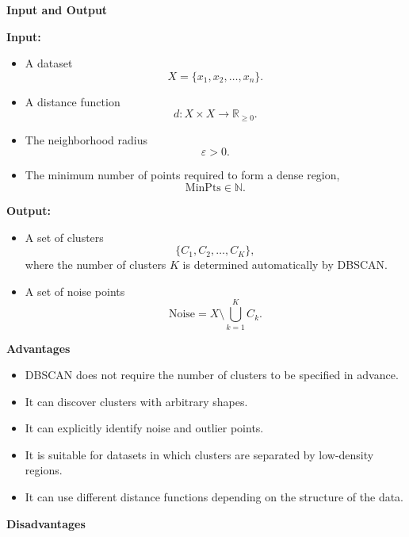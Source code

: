 \documentclass{book}
\providecommand{\ProjectDeepHeading}[2]{%
    \par\medskip\noindent\textbf{#2}\par\smallskip
}
\begin{document}
      \ProjectDeepHeading{4}{Input and Output}

         \textbf{Input:}

         \begin{itemize}
            \item A dataset
            \[
            X = \{x_1, x_2, \ldots, x_n\}.
            \]
            \item A distance function
            \[
            d : X \times X \rightarrow \mathbb{R}_{\geq 0}.
            \]
            \item The neighborhood radius
            \[
            \ensuremath{\varepsilon} > 0.
            \]
            \item The minimum number of points required to form a dense region,
            \[
            \mathrm{MinPts} \in \mathbb{N}.
            \]
         \end{itemize}

         \textbf{Output:}

         \begin{itemize}
            \item A set of clusters
            \[
            \{C_1, C_2, \ldots, C_K\},
            \]
            where the number of clusters $K$ is determined automatically by DBSCAN.
            \item A set of noise points
            \[
            \mathrm{Noise}
            =
            X \setminus \bigcup_{k=1}^{K} C_k.
            \]
         \end{itemize}
      \ProjectDeepHeading{4}{Advantages}

         \begin{itemize}
            \item DBSCAN does not require the number of clusters to be specified in advance.
            \item It can discover clusters with arbitrary shapes.
            \item It can explicitly identify noise and outlier points.
            \item It is suitable for datasets in which clusters are separated by low-density regions.
            \item It can use different distance functions depending on the structure of the data.
         \end{itemize}

      \ProjectDeepHeading{4}{Disadvantages}
\end{document}
